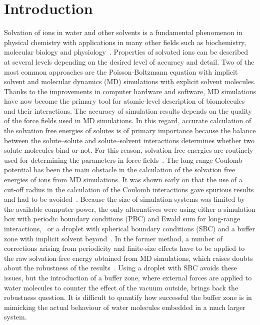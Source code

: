 \section{Introduction}
Solvation of ions in water and other solvents is a fundamental phenomenon in physical chemistry with 
applications in many other fields such as biochemistry, molecular biology and 
physiology~\cite{Hunenberger2011,Marcus1986}. Properties of solvated ions can be described at several 
levels depending on the desired level of accuracy and detail. Two of the most common approaches are the 
Poisson-Boltzmann equation with implicit solvent and molecular dynamics (MD) simulations with explicit 
solvent molecules. Thanks to the improvements in computer hardware and software, MD simulations have 
now become the primary tool for atomic-level description of biomolecules and their interactions. The 
accuracy of simulation results depends on the quality of the force fields used in MD simulations. In 
this regard, accurate calculation of the solvation free energies of solutes is of primary importance 
because the balance between the solute--solute and solute--solvent interactions determines whether two 
solute molecules bind or not. For this reason, solvation free energies are routinely used for determining 
the parameters in force fields~\cite{Brooks2009b,Wang2004,Oostenbrink2004,Jorgensen1996}. The long-range 
Coulomb potential has been the main obstacle in the calculation of the solvation free energies of ions from 
MD simulations. It was shown early on that the use of a cut-off radius in the calculation of the Coulomb 
interactions gave spurious results and had to be avoided~\cite{Straatsma1988a}. Because the size of 
simulation systems was limited by the available computer power, the only alternatives were using either 
a simulation box with periodic boundary conditions (PBC) and Ewald sum for long-range interactions,~\cite{Hummer1998,Hunenberger2011} or a droplet with spherical boundary conditions (SBC) 
and a buffer zone with implicit solvent beyond~\cite{Aqvist1990,Beglov1994}. In the former method, a 
number of corrections arising from periodicity and finite-size effects have to be applied to the raw 
solvation free energy obtained from MD simulations, which raises doubts about the robustness of the 
results~\cite{Lin2014a}. Using a droplet with SBC avoids these issues, but the introduction of a buffer 
zone, where external forces are applied to water molecules to counter the effect of the vacuum outside, 
brings back the robustness question. It is difficult to quantify how successful the buffer zone is in 
mimicking the actual behaviour of water molecules embedded in a much larger system.

